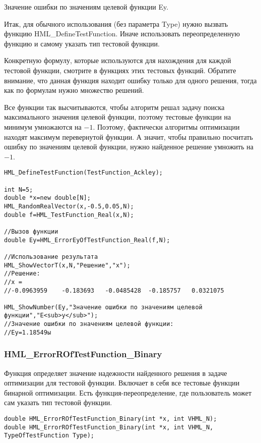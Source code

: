 \documentclass[a4paper,12pt]{article}
\begin{document}
Значение ошибки по значениям целевой функции Ey.

Итак, для обычного использования (без параметра Type) нужно вызвать функцию HML\_DefineTestFunction. Иначе использовать переопределенную функцию и самому указать тип тестовой функции.

Конкретную формулу, которые используются для нахождения для каждой тестовой функции, смотрите в функциях этих тестовых функций. Обратите внимание, что данная функция находит ошибку только для одного решения, тогда как по формулам нужно множество решений.

Все функции так высчитываются, чтобы алгоритм решал задачу поиска максимального значения целевой функции, поэтому тестовые функции на минимум умножаются на $-1$. Поэтому, фактически алгоритмы оптимизации находят максимум перевернутой функции. А значит, чтобы правильно посчитать ошибку по значениям целевой функции, нужно найденное решение умножить на $-1$.


\begin{lstlisting}[label=code_use_HML_ErrorEyOfTestFunction_Real,caption=Пример использования]
HML_DefineTestFunction(TestFunction_Ackley);

int N=5;
double *x=new double[N];
HML_RandomRealVector(x,-0.5,0.05,N);
double f=HML_TestFunction_Real(x,N);

//Вызов функции
double Ey=HML_ErrorEyOfTestFunction_Real(f,N);

//Использование результата
HML_ShowVectorT(x,N,"Решение","x");
//Решение:
//x =
//-0.0963959	-0.183693	-0.0485428	-0.185757	0.0321075

HML_ShowNumber(Ey,"Значение ошибки по значениям целевой функции","E<sub>y</sub>");
//Значение ошибки по значениям целевой функции:
//Ey=1.18549ы
\end{lstlisting}

\subsubsection{HML\_ErrorROfTestFunction\_Binary}\label{HML_ErrorROfTestFunction_Binary}

Функция определяет значение надежности найденного решения в задаче оптимизации для тестовой функции. Включает в себя все тестовые функции бинарной оптимизации. Есть функция-переопределение, где пользователь может сам указать тип тестовой функции.


\begin{lstlisting}[label=code_syntax_HML_ErrorROfTestFunction_Binary,caption=Синтаксис]
double HML_ErrorROfTestFunction_Binary(int *x, int VHML_N);
double HML_ErrorROfTestFunction_Binary(int *x, int VHML_N, TypeOfTestFunction Type);
\end{lstlisting}
\end{document}
